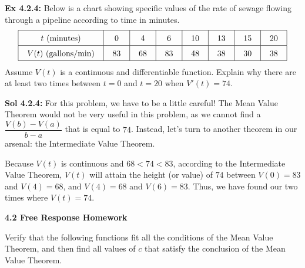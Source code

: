 \begin{tcolorbox}[example]
    \textbf{Ex 4.2.4: } Below is a chart showing specific values of the rate of sewage flowing through a pipeline according to time in minutes. \begin{align*}
        \arraycolsep=11pt\def\arraystretch{1.5}
        \begin{array}{|c|c|c|c|c|c|c|c|}
            \hline
            t \text{ (minutes)} & 0 & 4 & 6 & 10 & 13 & 15 & 20 \\ \hline
            V(t) \text{ (gallons/min)} & 83 & 68 & 83 & 48 & 38 & 30 & 38 \\
            \hline 
        \end{array}
    \end{align*}
    Assume $V(t)$ is a continuous and differentiable function. Explain why there are at least two times between $t = 0$ and $t = 20$ when $V'(t) = 74$.
\end{tcolorbox}
\begin{tcolorbox}[solution]
    \textbf{Sol 4.2.4: } For this problem, we have to be a little careful! The Mean Value Theorem would not be very useful in this problem, as we cannot find a $\dfrac{V(b) - V(a)}{b - a}$ that is equal to $74$. Instead, let's turn to another theorem in our arsenal: the Intermediate Value Theorem. \par
    \vspace{11pt}
    Because $V(t)$ is continuous and $68 < 74 < 83$, according to the Intermediate Value Theorem, $V(t)$ will attain the height (or value) of $74$ between $V(0) = 83$ and $V(4) = 68$, and $V(4) = 68$ and $V(6) = 83$. Thus, we have found our two times where $V(t) = 74$.
\end{tcolorbox}

\newpage

\textbf{\large{4.2 Free Response Homework}} \par

Verify that the following functions fit all the conditions of the Mean Value Theorem, and then find all values of $c$ that satisfy the conclusion of the Mean Value Theorem. \par

 \\[11pt]
 \\[11pt]


